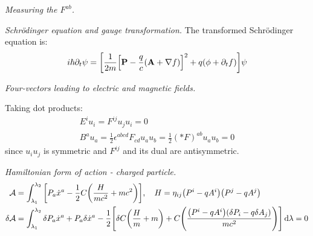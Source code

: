 \documentclass{report}
\begin{document}
\begin{subquests}
	\item \emph{Measuring the $F^{ab}$.}

	\item \emph{Schr\"odinger equation and gauge transformation.}
	The transformed Schr\"odinger equation is:
	\begin{align*}
		i\hbar\partial_t \psi = \bqty{\frac{1}{2m}\bqty{\mathbf{P} - \frac{q}{c}\pqty{\mathbf A + \nabla f}}^2 + q\pqty{\phi + \partial_t f}}\psi
	\end{align*}

	\item \emph{Four-vectors leading to electric and magnetic fields.}
	\begin{subquests}
		\item Taking dot products:
		\begin{gather*}
			E^i u_i = F^{ij}u_j u_i = 0 \\
			B^a u_a = \frac{1}{2}\epsilon^{abcd}F_{cd}u_a u_b = \frac{1}{2}(*F)^{ab}u_a u_b = 0
		\end{gather*}
		since $u_i u_j$ is symmetric and $F^{ij}$ and its dual are antisymmetric.

		\item
	\end{subquests}

	\item \emph{Hamiltonian form of action - charged particle.}
	\begin{align*}
		\mathcal A & = \int_{\lambda_1}^{\lambda_2} \bqty{P_a \dot x^a - \frac{1}{2}C\pqty{\frac{H}{mc^2} + mc^2}}, \quad H = \eta_{ij}\pqty{P^i - qA^i}\pqty{P^j - qA^j} \\
		\delta\mathcal A & = \int_{\lambda_1}^{\lambda_2}\delta P_a \dot x^a + P_a \delta\dot x^a -\frac{1}{2}\bqty{\delta C\pqty{\frac{H}{m} + m} + C\pqty{\frac{\pqty{P^i - qA^i}\pqty{\delta P_i -q \delta A_j}}{mc^2}}} \dd{\lambda} = 0 
	\end{align*}


\end{subquests}
\end{document}
